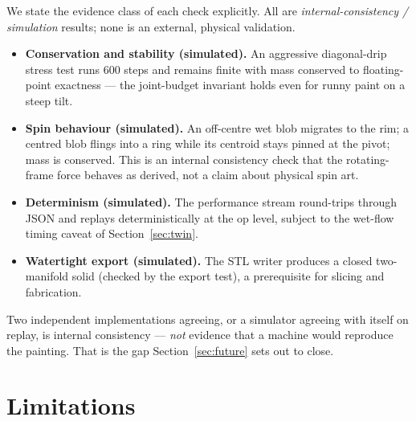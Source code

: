 \documentclass[11pt]{article}
\begin{document}
We state the evidence class of each check explicitly. All are
\emph{internal-consistency / simulation} results; none is an external, physical
validation.
\begin{itemize}
\item \textbf{Conservation and stability (simulated).} An aggressive
  diagonal-drip stress test runs \num{600} steps and remains finite with mass
  conserved to floating-point exactness --- the joint-budget invariant holds even
  for runny paint on a steep tilt.
\item \textbf{Spin behaviour (simulated).} An off-centre wet blob migrates to the
  rim; a centred blob flings into a ring while its centroid stays pinned at the
  pivot; mass is conserved. This is an internal consistency check that the
  rotating-frame force behaves as derived, not a claim about physical spin art.
\item \textbf{Determinism (simulated).} The performance stream round-trips
  through JSON and replays deterministically at the op level, subject to the
  wet-flow timing caveat of Section~\ref{sec:twin}.
\item \textbf{Watertight export (simulated).} The STL writer produces a closed
  two-manifold solid (checked by the export test), a prerequisite for slicing and
  fabrication.
\end{itemize}
Two independent implementations agreeing, or a simulator agreeing with itself on
replay, is internal consistency --- \emph{not} evidence that a machine would
reproduce the painting. That is the gap Section~\ref{sec:future} sets out to
close.

\section{Limitations}
\label{sec:limits}
\end{document}
